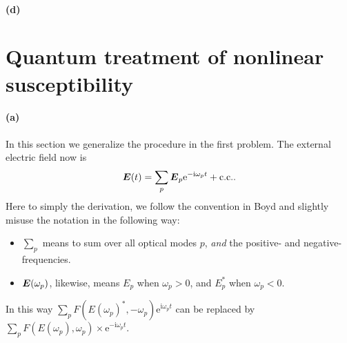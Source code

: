 \documentclass[hyperref, a4paper]{article}
\newcommand*{\ii}{\mathrm{i}}
\newcommand*{\ee}{\mathrm{e}}
\begin{document}
\paragraph*{(d)} 

\section{Quantum treatment of nonlinear susceptibility}

\paragraph*{(a)} In this section we generalize the procedure in the first problem.
The external electric field now is  
\begin{equation}
    \vb*{E}(t) = \sum_p \vb*{E}_p \ee^{- \ii \omega_p t} + \text{c.c.}.
\end{equation}
Here to simply the derivation, 
we follow the convention in Boyd and slightly misuse the notation in the following way:
\begin{itemize}
    \item $\sum_p$ means to sum over all optical modes $p$, 
    \emph{and} the positive- and negative-frequencies.
    \item $\vb*{E}(\omega_p)$, likewise, means 
    $E_p$ when $\omega_p > 0$, 
    and $E_p^*$ when $\omega_p < 0$.
\end{itemize}
In this way $\sum_p F(E(\omega_p)^*, - \omega_p) \ee^{\ii \omega_p t}$
can be replaced by $\sum_p F(E(\omega_p), \omega_p) \times \ee^{- \ii \omega_p t}$.
\end{document}
